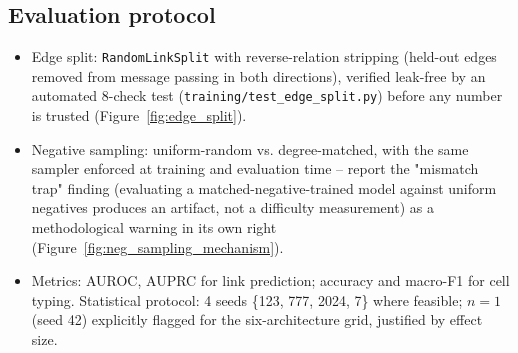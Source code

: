 \documentclass{bmcart}
\begin{document}
\subsection*{Evaluation protocol}
\begin{itemize}
\item [STAGE] Edge split: \texttt{RandomLinkSplit} with reverse-relation stripping
(held-out edges removed from message passing in both directions), verified leak-free by
an automated 8-check test (\texttt{training/test\_edge\_split.py}) before any number is
trusted (Figure~\ref{fig:edge_split}).
\item [STAGE] Negative sampling: uniform-random vs. degree-matched, with the same
sampler enforced at training and evaluation time -- report the "mismatch trap" finding
(evaluating a matched-negative-trained model against uniform negatives produces an
artifact, not a difficulty measurement) as a methodological warning in its own right
(Figure~\ref{fig:neg_sampling_mechanism}).
\item [STAGE] Metrics: AUROC, AUPRC for link prediction; accuracy and macro-F1 for cell
typing. Statistical protocol: 4 seeds \{123, 777, 2024, 7\} where feasible; $n=1$ (seed
42) explicitly flagged for the six-architecture grid, justified by effect size.
\end{itemize}
\end{document}
